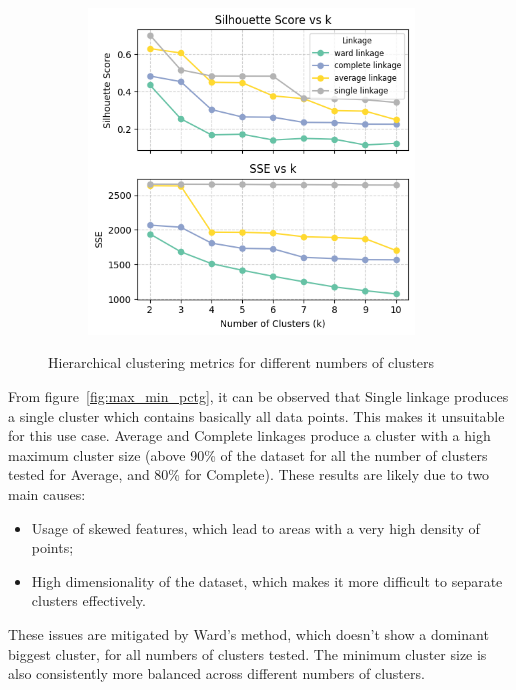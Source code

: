 \begin{figure}[H]
\begin{subfigure}[t]{0.49\textwidth}
        \includegraphics[width=0.95\textwidth]{plots/sil_sse_hierarchical_clust.png}
        \label{fig:sil_sse_hierarchical_clust}
    \end{subfigure}
    \caption{Hierarchical clustering metrics for different numbers of clusters}
    \label{fig:hier_clust_stats}
\end{figure}

From figure~\ref{fig:max_min_pctg}, it can be observed that Single linkage produces a single cluster which contains basically all data points. This makes it unsuitable for this use case.
Average and Complete linkages produce a cluster with a high maximum cluster size (above 90\% of the dataset for all the number of clusters tested for Average, and 80\% for Complete).
These results are likely due to two main causes: 
\begin{itemize}
    \item Usage of skewed features, which lead to areas with a very high density of points;
    \item High dimensionality of the dataset, which makes it more difficult to separate clusters effectively.
\end{itemize}

These issues are mitigated by Ward's method, which doesn't show a dominant biggest cluster, for
all numbers of clusters tested. The minimum cluster size is also consistently more balanced
across different numbers of clusters.\\


